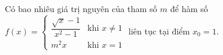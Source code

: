 \begin{ex}
Có bao nhiêu giá trị nguyên của tham số $m$ để hàm số $f(x)=\begin{cases}\dfrac{\sqrt x-1}{x^2-1}&\text{khi }x\ne1\\m^2x&\text{khi }x=1\end{cases}$ liên tục tại điểm $x_0=1$.
\end{ex}

